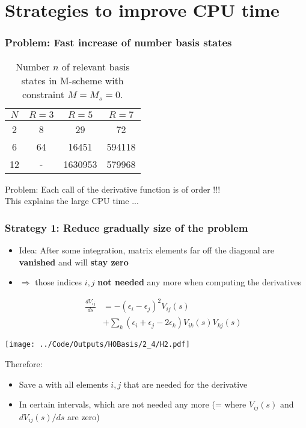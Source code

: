\documentclass[9pt]{beamer}
\begin{document}
\section{Strategies to improve CPU time}
\begin{frame}
\frametitle{Problem: Fast increase of number basis states}

\begin{table}
\begin{center}
\begin{tabular}{c| c c c}
\hline
 $N$ & $R=3$ & $R = 5$ & $R = 7$ \\
 \hline
  2  & 8 & 29 & 72\\
  6  & 64 & 16451 & 594118\\
 12  & - & 1630953& 579968 \\ 
 \hline
\end{tabular}
\end{center}
\caption{Number $n$ of relevant basis states in M-scheme with constraint $M = M_s = 0$.}
\end{table}

Problem: Each call of the derivative function is of order  {} !!!\\
This explains the large CPU time ...
\end{frame}

\begin{frame}
\frametitle{Strategy 1: Reduce gradually size of the problem}
\begin{minipage}[b]{0.62\linewidth}
\begin{itemize}
\item Idea: After some integration, matrix elements far off the diagonal are \textbf{vanished} and will \textbf{stay zero}\\
\item $\Rightarrow$ those indices $i,j$ \textbf{not needed} any more when computing the derivatives

\begin{align*}
\frac{d V_{ij}}{ds } &= -(\epsilon_i - \epsilon_j)^2 V_{ij}(s) \\
&+ \sum\limits_k \left(\epsilon_i + \epsilon_j -2 \epsilon_k \right) V_{ik}(s) V_{kj}(s)
\end{align*}
\end{itemize}
\end{minipage}
\begin{minipage}[t]{0.35\linewidth}
\begin{center}
\texttt{[image: ../Code/Outputs/HOBasis/2\_4/H2.pdf]}
\end{center}
\end{minipage}

Therefore:
\begin{itemize}
\item  Save a {\color{red}{list}} with all elements $i,j$ that are needed for the derivative
\item In certain intervals, {\color{red}{delete those elements}} which are not needed any more (= where $V_{ij}(s)$ and $dV_{ij}(s)/ds$ are zero)
 \end{itemize}
\end{frame}
\end{document}
